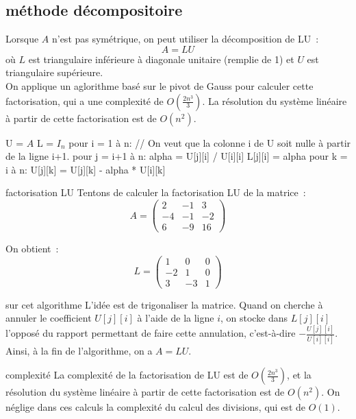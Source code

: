 \subsection{méthode décompositoire}

Lorsque $A$ n'est pas symétrique, on peut utiliser la décomposition de LU~:
$$A = L U$$
où $L$ est triangulaire inférieure à diagonale unitaire (remplie de 1) et $U$ est triangulaire supérieure.\\
On applique un aglorithme basé sur le pivot de Gauss pour calculer cette factorisation, qui a une complexité de $O(\frac{2n^3}{3})$. La résolution du système linéaire à partir de cette factorisation est de $O(n^2)$.
\begin{lstLNat}
    U = $A$
    L = $I_n$
    pour i = 1 à n:
        // On veut que la colonne i de U soit nulle à partir de la ligne i+1.
        pour j = i+1 à n:
            alpha = U[j][i] / U[i][i]
            L[j][i] = alpha
            pour k = i à n:
                U[j][k] = U[j][k] - alpha * U[i][k]

\end{lstLNat}

\begin{exemple}{}{factorisation LU}
    Tentons de calculer la factorisation LU de la matrice~:
    $$A = \begin{pmatrix}
        2 & -1 & 3\\
        -4 & -1 & -2\\
        6 & -9 & 16
    \end{pmatrix}$$
    
    On obtient~:
    $$L = \begin{pmatrix}
        1 & 0 & 0\\
        -2 & 1 & 0\\
        3 & -3 & 1
    \end{pmatrix}$$
\end{exemple}

\begin{remarque}{}{sur cet algorithme}
    L'idée est de trigonaliser la matrice. Quand on cherche à annuler le coefficient $U[j][i]$ à l'aide de la ligne $i$, on stocke dans $L[j][i]$ l'opposé du rapport permettant de faire cette annulation, c'est-à-dire $-\frac{U[j][i]}{U[i][i]}$. Ainsi, à la fin de l'algorithme, on a $A = L U$.
\end{remarque}

\begin{remarque}{}{complexité}
    La complexité de la factorisation de LU est de $O(\frac{2n^3}{3})$, et la résolution du système linéaire à partir de cette factorisation est de $O(n^2)$. On néglige dans ces calculs la complexité du calcul des divisions, qui est de $O(1)$.
\end{remarque}

